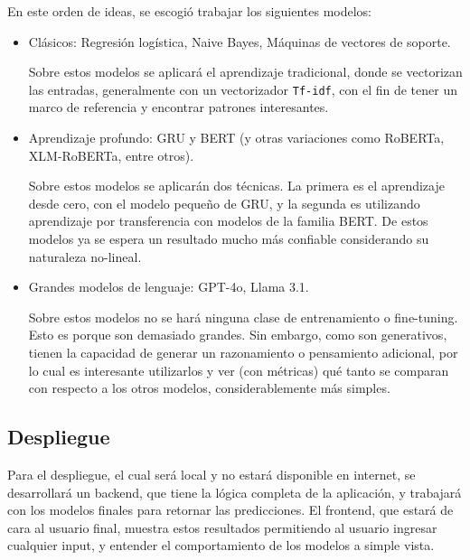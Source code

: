 En este orden de ideas, se escogió trabajar los siguientes modelos: 
\begin{itemize}
    \item Clásicos: Regresión logística, Naive Bayes, Máquinas de vectores de soporte.

    Sobre estos modelos se aplicará el aprendizaje tradicional, donde se vectorizan las entradas, generalmente con un vectorizador \verb|Tf-idf|, con el fin de tener un marco de referencia y encontrar patrones interesantes.
    
    \item Aprendizaje profundo: GRU y BERT (y otras variaciones como RoBERTa, XLM-RoBERTa, entre otros).

    Sobre estos modelos se aplicarán dos técnicas. La primera es el aprendizaje desde cero, con el modelo pequeño de GRU, y la segunda es utilizando aprendizaje por transferencia con modelos de la familia BERT. De estos modelos ya se espera un resultado mucho más confiable considerando su naturaleza no-lineal.
    
    \item Grandes modelos de lenguaje: GPT-4o, Llama 3.1.

    Sobre estos modelos no se hará ninguna clase de entrenamiento o fine-tuning. Esto es porque son demasiado grandes. Sin embargo, como son generativos, tienen la capacidad de generar un razonamiento o pensamiento adicional, por lo cual es interesante utilizarlos y ver (con métricas) qué tanto se comparan con respecto a los otros modelos, considerablemente más simples.
    
\end{itemize}

\subsection{Despliegue}

Para el despliegue, el cual será local y no estará disponible en internet, se desarrollará un backend, que tiene la lógica completa de la aplicación, y trabajará con los modelos finales para retornar las predicciones. El frontend, que estará de cara al usuario final, muestra estos resultados permitiendo al usuario ingresar cualquier input, y entender el comportamiento de los modelos a simple vista.
